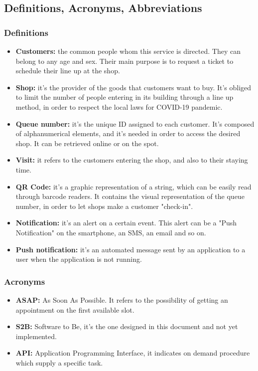 \documentclass[12pt]{article}
\begin{document}
\subsection{Definitions, Acronyms, Abbreviations}
\subsubsection{Definitions}
\begin{itemize}
    \item {\textbf{Customers:} the common people whom this service is directed. They can belong to any age and sex. Their main purpose is to request a ticket to schedule their line up at the shop.}
    \item {\textbf{Shop:} it's the provider of the goods that customers want to buy. It's obliged to limit the number of people entering in its building through a line up method, in order to respect the local laws for COVID-19 pandemic.}
    \item {\textbf{Queue number:} it's the unique ID assigned to each customer. It's composed of alphanumerical elements, and it's needed in order to access the desired shop. It can be retrieved online or on the spot.}
    \item {\textbf{Visit:} it refers to the customers entering the shop, and also to their staying time.}
    \item {\textbf{QR Code:} it's a graphic representation of a string, which can be easily read through barcode readers. It contains the visual representation of the queue number, in order to let shops make a customer "check-in".}
    \item {\textbf{Notification:} it's an alert on a certain event. This alert can be a "Push Notification" on the smartphone, an SMS, an email and so on.}
    \item {\textbf{Push notification:} it's an automated message sent by an application to a user when the application is not running.}
\end{itemize}
\subsubsection{Acronyms}
\begin{itemize}
    \item {\textbf{ASAP:} As Soon As Possible. It refers to the possibility of getting an appointment on the first available slot.}
    \item {\textbf{S2B:} Software to Be, it's the one designed in this document and not yet implemented.}
    \item {\textbf{API:} Application Programming Interface, it indicates on demand procedure which supply a specific task.}
\end{itemize}
\end{document}
